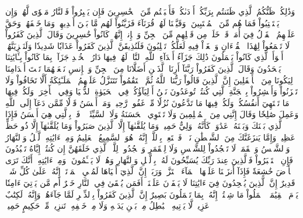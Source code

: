 وَذَٰلِكُمۡ ظَنُّكُمُ ٱلَّذِي ظَنَنتُم بِرَبِّكُمۡ أَرۡدَىٰكُمۡ فَأَصۡبَحۡتُم مِّنَ ٱلۡخَٰسِرِينَ
فَإِن يَصۡبِرُواْ فَٱلنَّارُ مَثۡوٗى لَّهُمۡۖ وَإِن يَسۡتَعۡتِبُواْ فَمَا هُم مِّنَ ٱلۡمُعۡتَبِينَ
۞وَقَيَّضۡنَا لَهُمۡ قُرَنَآءَ فَزَيَّنُواْ لَهُم مَّا بَيۡنَ أَيۡدِيهِمۡ وَمَا خَلۡفَهُمۡ وَحَقَّ عَلَيۡهِمُ ٱلۡقَوۡلُ فِيٓ أُمَمٖ قَدۡ خَلَتۡ مِن قَبۡلِهِم مِّنَ ٱلۡجِنِّ وَٱلۡإِنسِۖ إِنَّهُمۡ كَانُواْ خَٰسِرِينَ
وَقَالَ ٱلَّذِينَ كَفَرُواْ لَا تَسۡمَعُواْ لِهَٰذَا ٱلۡقُرۡءَانِ وَٱلۡغَوۡاْ فِيهِ لَعَلَّكُمۡ تَغۡلِبُونَ
فَلَنُذِيقَنَّ ٱلَّذِينَ كَفَرُواْ عَذَابٗا شَدِيدٗا وَلَنَجۡزِيَنَّهُمۡ أَسۡوَأَ ٱلَّذِي كَانُواْ يَعۡمَلُونَ
ذَٰلِكَ جَزَآءُ أَعۡدَآءِ ٱللَّهِ ٱلنَّارُۖ لَهُمۡ فِيهَا دَارُ ٱلۡخُلۡدِ جَزَآءَۢ بِمَا كَانُواْ بِـَٔايَٰتِنَا يَجۡحَدُونَ
وَقَالَ ٱلَّذِينَ كَفَرُواْ رَبَّنَآ أَرِنَا ٱلَّذَيۡنِ أَضَلَّانَا مِنَ ٱلۡجِنِّ وَٱلۡإِنسِ نَجۡعَلۡهُمَا تَحۡتَ أَقۡدَامِنَا لِيَكُونَا مِنَ ٱلۡأَسۡفَلِينَ
إِنَّ ٱلَّذِينَ قَالُواْ رَبُّنَا ٱللَّهُ ثُمَّ ٱسۡتَقَٰمُواْ تَتَنَزَّلُ عَلَيۡهِمُ ٱلۡمَلَـٰٓئِكَةُ أَلَّا تَخَافُواْ وَلَا تَحۡزَنُواْ وَأَبۡشِرُواْ بِٱلۡجَنَّةِ ٱلَّتِي كُنتُمۡ تُوعَدُونَ
نَحۡنُ أَوۡلِيَآؤُكُمۡ فِي ٱلۡحَيَوٰةِ ٱلدُّنۡيَا وَفِي ٱلۡأٓخِرَةِۖ وَلَكُمۡ فِيهَا مَا تَشۡتَهِيٓ أَنفُسُكُمۡ وَلَكُمۡ فِيهَا مَا تَدَّعُونَ
نُزُلٗا مِّنۡ غَفُورٖ رَّحِيمٖ
وَمَنۡ أَحۡسَنُ قَوۡلٗا مِّمَّن دَعَآ إِلَى ٱللَّهِ وَعَمِلَ صَٰلِحٗا وَقَالَ إِنَّنِي مِنَ ٱلۡمُسۡلِمِينَ
وَلَا تَسۡتَوِي ٱلۡحَسَنَةُ وَلَا ٱلسَّيِّئَةُۚ ٱدۡفَعۡ بِٱلَّتِي هِيَ أَحۡسَنُ فَإِذَا ٱلَّذِي بَيۡنَكَ وَبَيۡنَهُۥ عَدَٰوَةٞ كَأَنَّهُۥ وَلِيٌّ حَمِيمٞ
وَمَا يُلَقَّىٰهَآ إِلَّا ٱلَّذِينَ صَبَرُواْ وَمَا يُلَقَّىٰهَآ إِلَّا ذُو حَظٍّ عَظِيمٖ
وَإِمَّا يَنزَغَنَّكَ مِنَ ٱلشَّيۡطَٰنِ نَزۡغٞ فَٱسۡتَعِذۡ بِٱللَّهِۖ إِنَّهُۥ هُوَ ٱلسَّمِيعُ ٱلۡعَلِيمُ
وَمِنۡ ءَايَٰتِهِ ٱلَّيۡلُ وَٱلنَّهَارُ وَٱلشَّمۡسُ وَٱلۡقَمَرُۚ لَا تَسۡجُدُواْ لِلشَّمۡسِ وَلَا لِلۡقَمَرِ وَٱسۡجُدُواْۤ لِلَّهِۤ ٱلَّذِي خَلَقَهُنَّ إِن كُنتُمۡ إِيَّاهُ تَعۡبُدُونَ
فَإِنِ ٱسۡتَكۡبَرُواْ فَٱلَّذِينَ عِندَ رَبِّكَ يُسَبِّحُونَ لَهُۥ بِٱلَّيۡلِ وَٱلنَّهَارِ وَهُمۡ لَا يَسۡـَٔمُونَ۩
وَمِنۡ ءَايَٰتِهِۦٓ أَنَّكَ تَرَى ٱلۡأَرۡضَ خَٰشِعَةٗ فَإِذَآ أَنزَلۡنَا عَلَيۡهَا ٱلۡمَآءَ ٱهۡتَزَّتۡ وَرَبَتۡۚ إِنَّ ٱلَّذِيٓ أَحۡيَاهَا لَمُحۡيِ ٱلۡمَوۡتَىٰٓۚ إِنَّهُۥ عَلَىٰ كُلِّ شَيۡءٖ قَدِيرٌ
إِنَّ ٱلَّذِينَ يُلۡحِدُونَ فِيٓ ءَايَٰتِنَا لَا يَخۡفَوۡنَ عَلَيۡنَآۗ أَفَمَن يُلۡقَىٰ فِي ٱلنَّارِ خَيۡرٌ أَم مَّن يَأۡتِيٓ ءَامِنٗا يَوۡمَ ٱلۡقِيَٰمَةِۚ ٱعۡمَلُواْ مَا شِئۡتُمۡ إِنَّهُۥ بِمَا تَعۡمَلُونَ بَصِيرٌ
إِنَّ ٱلَّذِينَ كَفَرُواْ بِٱلذِّكۡرِ لَمَّا جَآءَهُمۡۖ وَإِنَّهُۥ لَكِتَٰبٌ عَزِيزٞ
لَّا يَأۡتِيهِ ٱلۡبَٰطِلُ مِنۢ بَيۡنِ يَدَيۡهِ وَلَا مِنۡ خَلۡفِهِۦۖ تَنزِيلٞ مِّنۡ حَكِيمٍ حَمِيدٖ
